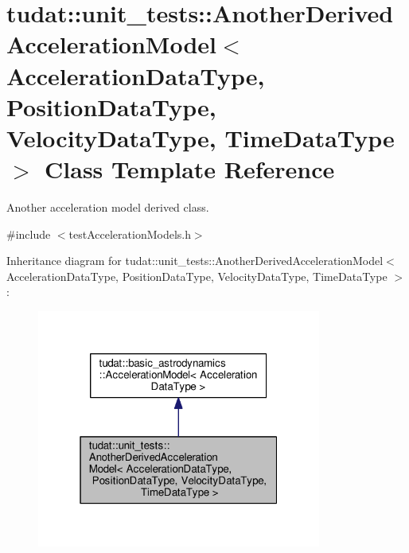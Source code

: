 \hypertarget{classtudat_1_1unit__tests_1_1AnotherDerivedAccelerationModel}{}\section{tudat\+:\+:unit\+\_\+tests\+:\+:Another\+Derived\+Acceleration\+Model$<$ Acceleration\+Data\+Type, Position\+Data\+Type, Velocity\+Data\+Type, Time\+Data\+Type $>$ Class Template Reference}
\label{classtudat_1_1unit__tests_1_1AnotherDerivedAccelerationModel}


Another acceleration model derived class.  




{\ttfamily \#include $<$test\+Acceleration\+Models.\+h$>$}



Inheritance diagram for tudat\+:\+:unit\+\_\+tests\+:\+:Another\+Derived\+Acceleration\+Model$<$ Acceleration\+Data\+Type, Position\+Data\+Type, Velocity\+Data\+Type, Time\+Data\+Type $>$\+:
\nopagebreak
\begin{figure}[H]
\begin{center}
\leavevmode
\includegraphics[width=265pt]{classtudat_1_1unit__tests_1_1AnotherDerivedAccelerationModel__inherit__graph}
\end{center}
\end{figure}


